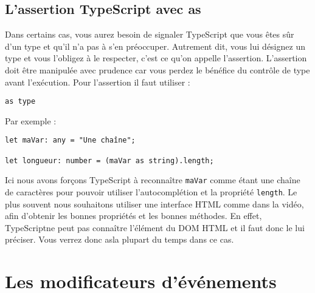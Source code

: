 \subsection{L'assertion {\color{monOrange}TypeScript} avec {\color{monOrange}as}}
Dans certains cas, vous aurez besoin de signaler {\color{monOrange}TypeScript} que vous êtes sûr d'un type et qu'il n'a pas à s'en préoccuper. Autrement dit, vous lui désignez un type et vous l'obligez à le respecter, c'est ce qu'on appelle l'assertion. L'assertion doit être manipulée avec prudence car vous perdez le bénéfice du contrôle de type avant l'exécution. Pour l'assertion il faut utiliser :
\begin{verbatim}
as type
\end{verbatim}
Par exemple :
\begin{verbatim}
let maVar: any = "Une chaîne";

let longueur: number = (maVar as string).length;
\end{verbatim}
Ici nous avons forçons {\color{monOrange}TypeScript} à reconnaître {\tt maVar} comme étant une chaîne de caractères pour pouvoir utiliser l'autocomplétion et la propriété {\tt length}. Le plus souvent nous souhaitons utiliser une interface HTML comme dans la vidéo, afin d'obtenir les bonnes propriétés et les bonnes méthodes. En effet, TypeScriptne peut pas connaître l'élément du DOM HTML et il faut donc le lui préciser. Vous verrez donc asla plupart du temps dans ce cas.



\section{Les modificateurs d'événements}
